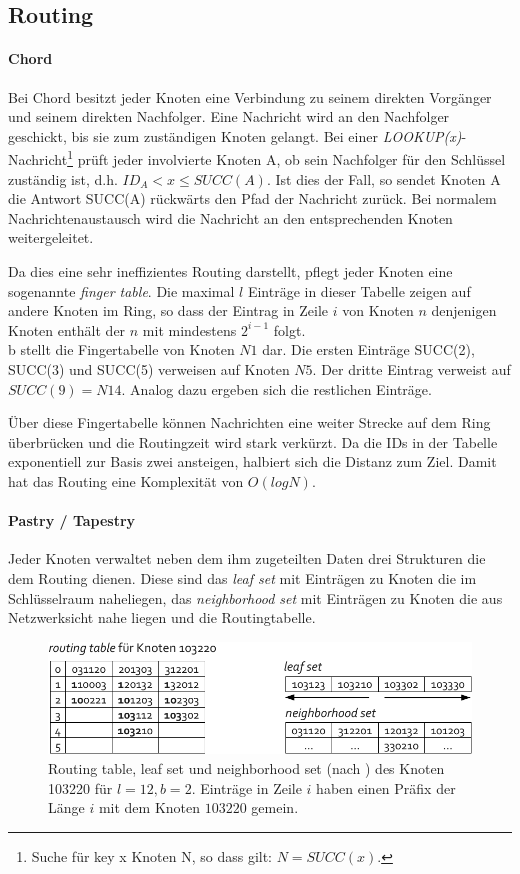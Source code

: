 \subsection{Routing}
\paragraph{Chord}
Bei Chord besitzt jeder Knoten eine Verbindung zu seinem direkten Vorgänger und seinem direkten Nachfolger. Eine Nachricht wird an den Nachfolger geschickt, bis sie zum zuständigen Knoten gelangt. Bei einer \emph{LOOKUP(x)}-Nachricht\footnote{Suche für key x Knoten N, so dass gilt: $N = SUCC(x)$.} prüft jeder involvierte Knoten A, ob sein Nachfolger für den Schlüssel zuständig ist, d.h. $ID_A < x \le SUCC(A)$. Ist dies der Fall, so sendet Knoten A die Antwort SUCC(A) rückwärts den Pfad der Nachricht zurück. Bei normalem Nachrichtenaustausch wird die Nachricht an den entsprechenden Knoten weitergeleitet.

Da dies eine sehr ineffizientes  Routing darstellt, pflegt jeder Knoten eine sogenannte \emph{finger table}. Die maximal $l$ Einträge in dieser Tabelle zeigen auf andere Knoten im Ring, so dass der Eintrag in Zeile $i$ von Knoten $n$ denjenigen Knoten enthält der $n$ mit mindestens $2^{i-1}$ folgt.\\
 b stellt die Fingertabelle von Knoten $N1$ dar. Die ersten Einträge SUCC(2), SUCC(3) und SUCC(5) verweisen auf Knoten $N5$. Der dritte Eintrag verweist auf $SUCC(9) = N14$. Analog dazu ergeben sich die restlichen Einträge.

Über diese Fingertabelle können Nachrichten eine weiter Strecke auf dem Ring überbrücken und die Routingzeit wird stark verkürzt. Da die IDs in der Tabelle exponentiell zur Basis zwei ansteigen, halbiert sich die Distanz zum Ziel. Damit hat das Routing eine Komplexität von $O(log N)$.

\paragraph{Pastry / Tapestry}
Jeder Knoten verwaltet neben dem ihm zugeteilten Daten drei Strukturen die dem Routing dienen. Diese sind das \emph{leaf set} mit Einträgen zu Knoten die im Schlüsselraum naheliegen, das \emph{neighborhood set} mit Einträgen zu Knoten die aus Netzwerksicht nahe liegen und die Routingtabelle.

\begin{figure}[htb]
\centering
\includegraphics{grafics/pastry_routing_table.pdf}
\caption{Routing table, leaf set und neighborhood set (nach \cite{Goetz2005}) des Knoten 103220 für $l=12, b=2$. Einträge in Zeile $i$ haben einen Präfix der Länge $i$ mit dem Knoten $103220$ gemein.}
\label{fig:pastry_routing_table}
\end{figure}

